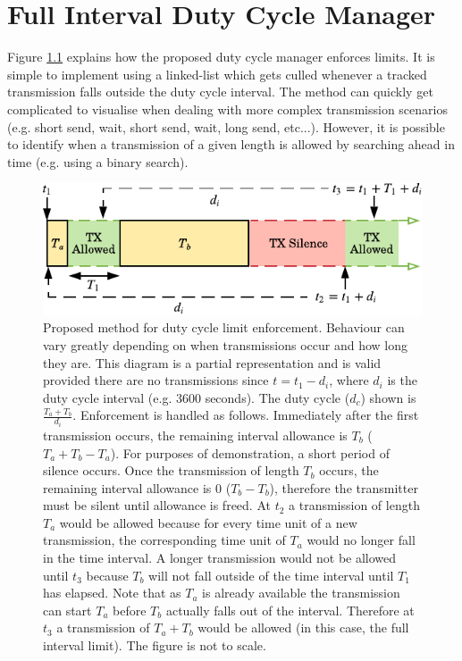 \chapter{Full Interval Duty Cycle Manager}\label{sec:proposed_duty_cycle}
Figure \ref{fig:proposed_duty_cycle} explains how the proposed duty cycle manager enforces limits. It is simple to implement using a linked-list which gets culled whenever a tracked transmission falls outside the duty cycle interval. The method can quickly get complicated to visualise when dealing with more complex transmission scenarios  (e.g. short send, wait, short send, wait, long send, etc...). However, it is possible to identify when a transmission of a given length is allowed by searching ahead in time (e.g. using a binary search).
\begin{figure}[H]
    \centering
   	\includegraphics{Figures/duty_cycle_proposed.pdf}
    \caption[Proposed duty cycle enforcement method]{
    Proposed method for duty cycle limit enforcement. Behaviour can vary greatly depending on when transmissions occur and how long they are. This diagram is a partial representation and is valid provided there are no transmissions since $t=t_1-d_i$, where $d_i$ is the duty cycle interval (e.g. 3600 seconds). The duty cycle ($d_c$) shown is $\frac{T_a + T_b}{d_i}$. Enforcement is handled as follows. Immediately after the first transmission occurs, the remaining interval allowance is $T_b$ ($T_a+T_b-T_a$). For purposes of demonstration, a short period of silence occurs. Once the transmission of length $T_b$ occurs, the remaining interval allowance is 0 ($T_b - T_b$), therefore the transmitter must be silent until allowance is freed. At $t_2$ a transmission of length $T_a$ would be allowed because for every time unit of a new transmission, the corresponding time unit of $T_a$ would no longer fall in the time interval. A longer transmission would not be allowed until $t_3$ because $T_b$ will not fall outside of the time interval until $T_1$ has elapsed. Note that as $T_a$ is already available the transmission can start $T_a$ before $T_b$ actually falls out of the interval. Therefore at $t_3$ a transmission of $T_a + T_b$ would be allowed (in this case, the full interval limit). The figure is not to scale.    
    }
    \label{fig:proposed_duty_cycle}
\end{figure}

